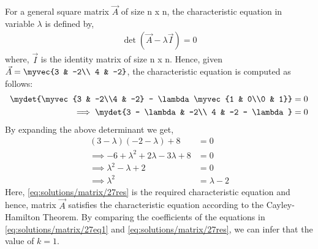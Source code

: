 
For a general square matrix $\vec{A}$ of size n x n, the characteristic equation in variable $\lambda$ is defined by,
\begin{align}
	\det({ \vec{A} - \lambda \vec{I}}) = 0\end{align}
	where, $\vec{I}$ is the identity matrix of size n x n.
Hence, given $\vec{A} = \myvec{3 & -2\\ 4 & -2}$, the characteristic equation is computed as follows:
\begin{align}
    \mydet{\myvec{3 & -2\\4 & -2} - \lambda \myvec{1 & 0\\0 & 1}} = 0\\
    \implies \mydet{3 - \lambda & -2\\ 4 & -2 - \lambda} = 0
\end{align}
By expanding the above determinant we get,
\begin{align}
	 (3 - \lambda)(-2 - \lambda) + 8 &= 0\\
	\implies -6 + \lambda^2 + 2\lambda - 3\lambda + 8 &= 0\\
	\implies \lambda^2 - \lambda + 2 &= 0 \\
	\implies \lambda^2 &= \lambda - 2\label{eq:solutions/matrix/27res}
\end{align} 
Here, \eqref{eq:solutions/matrix/27res} is the required characteristic equation and hence, matrix $\vec{A}$ satisfies the characteristic equation according to the Cayley-Hamilton Theorem.
By comparing the coefficients of the equations in \eqref{eq:solutions/matrix/27eq1} and \eqref{eq:solutions/matrix/27res}, we can infer that the value of $k = 1$.
